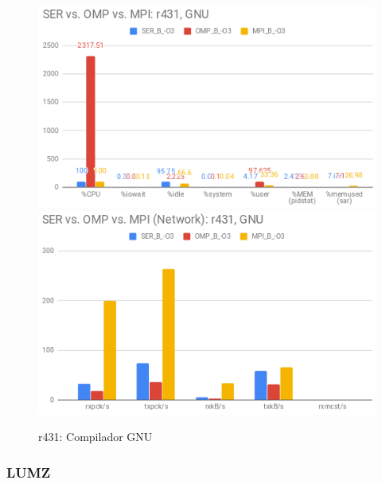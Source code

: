 \documentclass{article}
\begin{document}
\begin{appendices}
\begin{figure}[H]
    \centering
    \includegraphics[width=12cm]{Pictures/FT_SER_OMP_MPI_r431_GNU_Comp.png}
    \includegraphics[width=12cm]{Pictures/FT_SER_OMP_MPI_r431_GNU_Comm.png}
    \caption{r431: Compilador GNU}
    \label{fig:ft_ser_omp_mpi_r431_gnu}
\end{figure}

\subsubsection{LUMZ}


\end{appendices}
\end{document}
